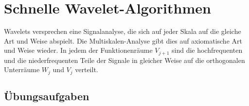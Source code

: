 %
%
%
\chapter{Schnelle Wavelet-Algorithmen
\label{chapter:algo}}
Wavelets versprechen eine Signalanalyse, die sich auf jeder Skala auf
die gleiche Art und Weise abspielt.
Die Multiskalen-Analyse gibt dies auf axiomatische Art und Weise wieder.
In jedem der Funktionenräume $V_{j+1}$ sind die hochfrequenten und die 
niederfrequenten Teile der Signale in gleicher Weise auf die 
orthogonalen Unterräume $W_j$ und $V_j$ verteilt.





\section*{Übungsaufgaben}






